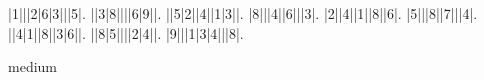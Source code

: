 \begin{sudoku}
|1|||2|6|3|||5|.
||3|8||||6|9||.
||5|2||4||1|3||.
|8|||4||6|||3|.
|2||4||1||8||6|.
|5|||8||7|||4|.
||4|1||8||3|6||.
||8|5||||2|4||.
|9|||1|3|4|||8|.
\end{sudoku}
\begin{center}
medium\end{center}